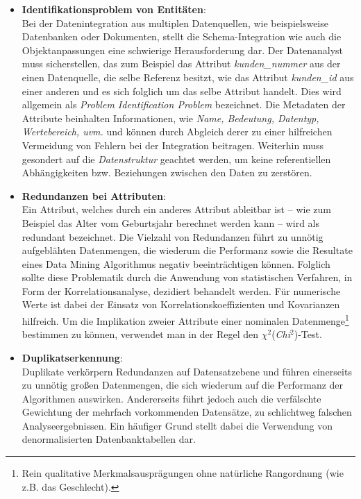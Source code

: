 \begin{itemize}
\item \textbf{Identifikationsproblem von Entitäten}:
\\ Bei der Datenintegration aus multiplen Datenquellen, wie beispielsweise Datenbanken oder Dokumenten, stellt die Schema-Integration wie auch die Objektanpassungen eine schwierige Herausforderung dar. Der Datenanalyst muss sicherstellen, das zum Beispiel das Attribut \textit{kunden\_nummer} aus der einen Datenquelle, die selbe Referenz besitzt, wie das Attribut \textit{kunden\_id} aus einer anderen und es sich folglich um das selbe Attribut handelt. Dies wird allgemein als \textit{Problem Identification Problem} bezeichnet. Die Metadaten der Attribute beinhalten Informationen, wie \textit{Name, Bedeutung, Datentyp, Wertebereich, uvm.} und können durch Abgleich derer zu einer hilfreichen Vermeidung von Fehlern bei der Integration beitragen. Weiterhin muss gesondert auf die \textit{Datenstruktur} geachtet werden, um keine referentiellen Abhängigkeiten bzw. Beziehungen zwischen den Daten zu zerstören. 

\item \textbf{Redundanzen bei Attributen}:
\\ Ein Attribut, welches durch ein anderes Attribut ableitbar ist -- wie zum Beispiel das Alter vom Geburtsjahr berechnet werden kann -- wird als redundant bezeichnet. Die Vielzahl von Redundanzen führt zu unnötig aufgeblähten Datenmengen, die wiederum die Performanz sowie die Resultate eines Data Mining Algorithmus negativ beeinträchtigen können. Folglich sollte diese Problematik durch die Anwendung von statistischen Verfahren, in Form der Korrelationsanalyse, dezidiert behandelt werden. Für numerische Werte ist dabei der Einsatz von Korrelationskoeffizienten und Kovarianzen hilfreich. Um die Implikation zweier Attribute einer nominalen Datenmenge\footnote{Rein qualitative Merkmalsausprägungen ohne natürliche Rangordnung (wie z.B. das Geschlecht).} bestimmen zu können, verwendet man in der Regel den $\chi^2$(\textit{Chi$^2$})-Test. 

\item \textbf{Duplikatserkennung}:
\\ Duplikate verkörpern Redundanzen auf Datensatzebene und führen einerseits zu unnötig großen Datenmengen, die sich wiederum auf die Performanz der Algorithmen auswirken. Andererseits führt jedoch auch die verfälschte Gewichtung der mehrfach vorkommenden Datensätze, zu schlichtweg falschen Analyseergebnissen. Ein häufiger Grund stellt dabei die Verwendung von denormalisierten Datenbanktabellen dar.


\end{itemize}
